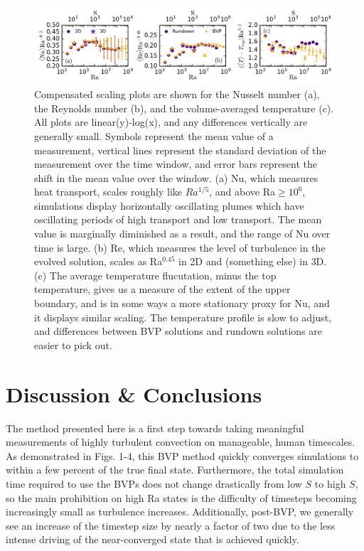 \documentclass[aps, pre, onecolumn, nofootinbib, notitlepage, groupedaddress, amsfonts, amssymb, amsmath, longbibliography]{revtex4-1}
\begin{document}
\begin{figure}[t]
\includegraphics[width=\textwidth]{./figs/parameter_space_comparison.png}
\caption{Compensated scaling plots are shown for the Nusselt number (a), the
Reynolds number (b), and the volume-averaged temperature (c).  All plots are linear(y)-log(x),
and any differences vertically are generally small.  Symbols represent the mean value of
a measurement, vertical lines represent the standard deviation of the measurement over the
time window, and error bars represent the shift in the mean value over the window.
(a) Nu, which measures heat transport, scales roughly like $Ra^{1/5}$, and above Ra$\geq 10^6$,
simulations display horizontally oscillating plumes which have oscillating periods of high transport
and low transport.  The mean value is marginally diminished as a result, and the range of Nu over time
is large. (b) Re, which measures the level of turbulence in the evolved solution, scales as
Ra$^{0.45}$ in 2D and (something else) in 3D. (c) The average temperature flucutation, minus the top
temperature, gives us a measure of the extent of the upper boundary, and is in some ways a more stationary
proxy for Nu, and it displays similar scaling.  The temperature profile is slow to adjust, and differences between
BVP solutions and rundown solutions are easier to pick out.
\label{fig:parameter_space_comparison} }
\end{figure}


\section{Discussion \& Conclusions}
\label{sec:results}
The method presented here is a first step towards taking meaningful measurements
of highly turbulent convection on manageable, human timescales.  As demonstrated in Figs.
1-4, this BVP method quickly converges simulations to within a few percent of the true final
state. Furthermore, the total simulation time required to use the BVPs does not change drastically from
low $S$ to high $S$, so the main prohibition on high Ra states is the difficulty of timesteps becoming
increasingly small as turbulence increases.  Additionally, post-BVP, we generally see an increase of the
timestep size by nearly a factor of two due to the less intense driving of the near-converged state that
is achieved quickly.
\end{document}
